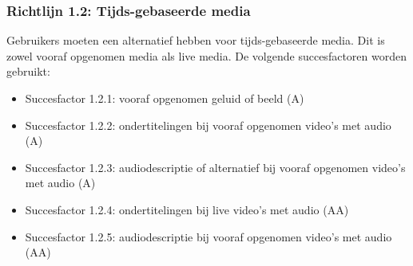 \subsubsection{Richtlijn 1.2: Tijds-gebaseerde media}
Gebruikers moeten een alternatief hebben voor tijds-gebaseerde media. Dit is zowel vooraf opgenomen media als live media. De volgende succesfactoren worden gebruikt: \begin{itemize}
    \item Succesfactor 1.2.1: vooraf opgenomen geluid of beeld (A)
    \item Succesfactor 1.2.2: ondertitelingen bij vooraf opgenomen video’s met audio (A)
    \item Succesfactor 1.2.3: audiodescriptie of alternatief bij vooraf opgenomen video’s met audio (A)
    \item Succesfactor 1.2.4: ondertitelingen bij live video’s met audio (AA)
    \item Succesfactor 1.2.5: audiodescriptie bij vooraf opgenomen video’s met audio (AA)
\end{itemize}
